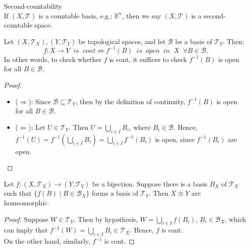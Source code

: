 \begin{definition}{Second-countability}\\
If $(X,\mathcal{T})$ is a countable basis, e.g.: $\mathbb{R}^n$, then we say  $(X,\mathcal{T})$ is a second-countable space.
\end{definition}

\begin{proposition}
    Let $(X,\mathcal{T}_X),(Y,\mathcal{T}_Y)$ be topological spaces, and let $\mathcal{B}$ be a basis of $\mathcal{T}_Y$. Then:
    $$f: X\rightarrow Y \;\; is \;\; cont \Leftrightarrow f^{-1}(B) \;\; is \;\; open \;\; in \;\; X \;\; \forall B\in \mathcal{B}.$$
    In other words, to check whether $f$ is cont, it suffices to check $f^{-1}(B)$ is open for all $B \in \mathcal{B}$.
\end{proposition}

\begin{proof}
    \begin{itemize}
        \item ($\Rightarrow$): Since $\mathcal{B} \subseteq \mathcal{T}_Y$, then by the definition of continuity, $f^{-1}(B)$ is open for all $B \in \mathcal{B}$.
        \item ($\Leftarrow$): Let $U \in \mathcal{T}_Y$. Then $U= \bigcup_{i\in I}B_i$, where $B_i \in \mathcal{B}$. Hence, $f^{-1}(U) = f^{-1}(\bigcup_{i\in I}B_i) = \bigcup_{i\in I} f^{-1}(B_i)$ is open, since $f^{-1}(B_i)$ are open.
    \end{itemize}
\end{proof}

\begin{corollary}
    Let $f: (X,\mathcal{T}_X)\rightarrow (Y,\mathcal{T}_Y)$ be a bijection. Suppose there is a basis $B_X$ of $\mathcal{T}_X$ such that $\{f(B) \mid B \in \mathcal{B}_X\}$ forms a basis of $\mathcal{T}_Y$. Then $X \cong Y$ are homeomorphic.
\end{corollary}

\begin{proof}
    Suppose $W \in \mathcal{T}_Y$. Then by hypothesis, $W = \bigcup_{i\in I}f(B_i)$, $B_i \in \mathcal{B}_X$, which can imply that $f^{-1}(W) = \bigcup_{i\in I}B_i \in \mathcal{T}_X$. Hence, $f$ is cont.\\
    On the other hand, similarly, $f^{-1}$ is cont.
\end{proof}

